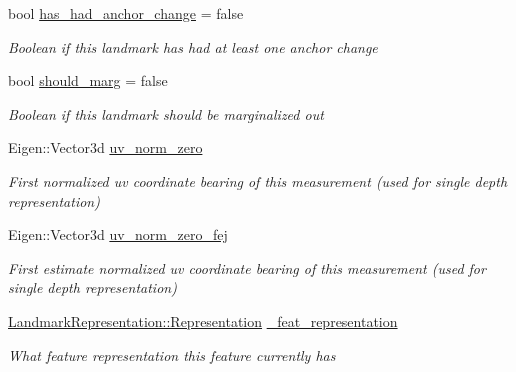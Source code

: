 \begin{DoxyCompactItemize}
bool \hyperlink{classov__type_1_1Landmark_a8c2faa8e153b95606c9062527fdd029e}{has\+\_\+had\+\_\+anchor\+\_\+change} = false
\begin{DoxyCompactList}\small\item\em Boolean if this landmark has had at least one anchor change \end{DoxyCompactList}\item 
\mbox{\label{classov__type_1_1Landmark_af1020195008ececef0aceec655af7b66}} 
bool \hyperlink{classov__type_1_1Landmark_af1020195008ececef0aceec655af7b66}{should\+\_\+marg} = false
\begin{DoxyCompactList}\small\item\em Boolean if this landmark should be marginalized out \end{DoxyCompactList}\item 
\mbox{\label{classov__type_1_1Landmark_a91175b33f67648b4613a4e8fbf45c57b}} 
Eigen\+::\+Vector3d \hyperlink{classov__type_1_1Landmark_a91175b33f67648b4613a4e8fbf45c57b}{uv\+\_\+norm\+\_\+zero}
\begin{DoxyCompactList}\small\item\em First normalized uv coordinate bearing of this measurement (used for single depth representation) \end{DoxyCompactList}\item 
\mbox{\label{classov__type_1_1Landmark_a1ec99a64bd719ecde264279aa7e45b5f}} 
Eigen\+::\+Vector3d \hyperlink{classov__type_1_1Landmark_a1ec99a64bd719ecde264279aa7e45b5f}{uv\+\_\+norm\+\_\+zero\+\_\+fej}
\begin{DoxyCompactList}\small\item\em First estimate normalized uv coordinate bearing of this measurement (used for single depth representation) \end{DoxyCompactList}\item 
\mbox{\label{classov__type_1_1Landmark_a0935ff64bd9d96b24e8437c96a6bbe3d}} 
\hyperlink{classov__type_1_1LandmarkRepresentation_a7f5783df6932ace7f098ae243b6d298e}{Landmark\+Representation\+::\+Representation} \hyperlink{classov__type_1_1Landmark_a0935ff64bd9d96b24e8437c96a6bbe3d}{\+\_\+feat\+\_\+representation}
\begin{DoxyCompactList}\small\item\em What feature representation this feature currently has \end{DoxyCompactList}\end{DoxyCompactItemize}
